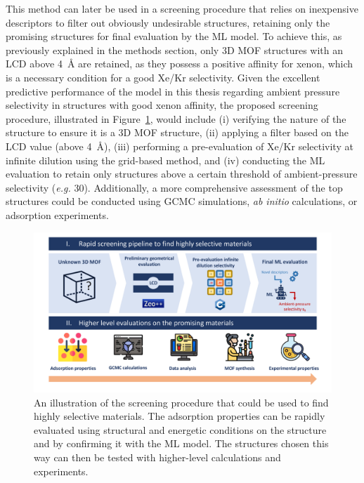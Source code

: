 \documentclass[main]{subfiles}
\begin{document}
This method can later be used in a screening procedure that relies on inexpensive descriptors to filter out obviously undesirable structures, retaining only the promising structures for final evaluation by the ML model. To achieve this, as previously explained in the methods section, only 3D MOF structures with an LCD above \SI{4}{\angstrom} are retained, as they possess a positive affinity for xenon, which is a necessary condition for a good Xe/Kr selectivity. Given the excellent predictive performance of the model in this thesis regarding ambient pressure selectivity in structures with good xenon affinity, the proposed screening procedure, illustrated in Figure~\ref{fgr:pipeline}, would include (i) verifying the nature of the structure to ensure it is a 3D MOF structure, (ii) applying a filter based on the LCD value (above \SI{4}{\angstrom}), (iii) performing a pre-evaluation of Xe/Kr selectivity at infinite dilution using the grid-based method, and (iv) conducting the ML evaluation to retain only structures above a certain threshold of ambient-pressure selectivity (\emph{e.g.} 30). Additionally, a more comprehensive assessment of the top structures could be conducted using GCMC simulations, \emph{ab initio} calculations, or adsorption experiments.

\begin{figure}[ht]
\centering
  \includegraphics[width=0.99\linewidth]{figures/4-ml/main/pipeline.pdf}
  \caption{An illustration of the screening procedure that could be used to find highly selective materials. The adsorption properties can be rapidly evaluated using structural and energetic conditions on the structure and by confirming it with the ML model. The structures chosen this way can then be tested with higher-level calculations and experiments. }\label{fgr:pipeline}
\end{figure}
\end{document}
